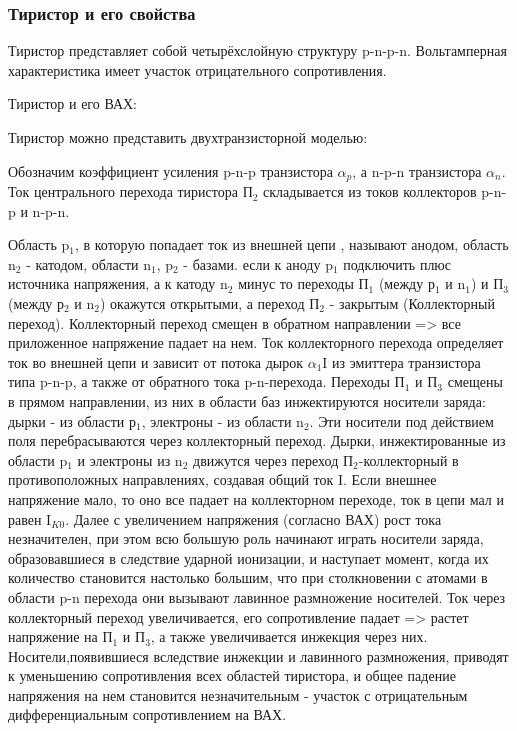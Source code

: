 \subsubsection{Тиристор и его свойства}

Тиристор представляет собой четырёхслойную структуру p-n-p-n. Вольтамперная характеристика имеет участок отрицательного сопротивления. 

Тиристор и его ВАХ:
\begin{center}
	\begin{figure}[h!]
		\caption{}	
	\end{figure}
\end{center}

Тиристор можно представить двухтранзисторной моделью:
\begin{center}
	\begin{figure}[h!]
		\caption{}	
	\end{figure}
\end{center}


Обозначим коэффициент усиления p-n-p транзистора $\alpha_p$, а n-p-n транзистора $\alpha_n$. Ток центрального перехода тиристора П$_2$ складывается из токов коллекторов p-n-p и n-p-n. 

Область p$_1$, в которую попадает ток из внешней цепи , называют анодом, область n$_2$  - катодом, области n$_1$, p$_2$ - базами. если к аноду p$_1$ подключить плюс источника напряжения, а к катоду n$_2$ минус то переходы П$_1$ (между р$_1$ и n$_1$) и  П$_3$ (между р$_2$ и n$_2$) окажутся открытыми, а переход П$_2$ - закрытым (Коллекторный переход). Коллекторный переход смещен в обратном направлении => все приложенное напряжение падает на нем. Ток коллекторного перехода определяет ток во внешней цепи и зависит от потока дырок $\alpha_1$I из эмиттера транзистора типа p-n-p, а также от обратного тока p-n-перехода. Переходы П$_1$ и П$_3$ смещены в прямом направлении, из них в области баз инжектируются носители заряда: дырки - из области р$_1$, электроны - из области n$_2$. Эти носители под действием поля перебрасываются через коллекторный переход. Дырки, инжектированные из области p$_1$ и электроны из n$_2$ движутся через переход П$_2$-коллекторный в противоположных направлениях, создавая общий ток I. Если внешнее напряжение мало, то оно все падает на коллекторном переходе, ток в цепи мал и равен I$_{K0}$. Далее с увеличением напряжения (согласно ВАХ) рост тока незначителен, при этом всю большую роль начинают играть носители заряда, образовавшиеся в следствие ударной ионизации, и наступает момент, когда их количество становится настолько большим, что при столкновении с атомами в области p-n перехода они вызывают лавинное размножение носителей. Ток через коллекторный переход увеличивается, его сопротивление падает => растет напряжение на П$_1$ и П$_3$, а также увеличивается инжекция через них. Носители,появившиеся вследствие инжекции и лавинного размножения, приводят к уменьшению сопротивления всех областей тиристора, и общее падение напряжения на нем становится незначительным - участок с отрицательным дифференциальным сопротивлением на ВАХ.

